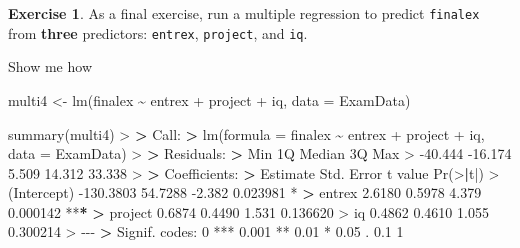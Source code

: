 \documentclass[
]{book}
\newenvironment{Shaded}{\begin{snugshade}}{\end{snugshade}}
\newcommand{\AttributeTok}[1]{\textcolor[rgb]{0.77,0.63,0.00}{#1}}
\newcommand{\DecValTok}[1]{\textcolor[rgb]{0.00,0.00,0.81}{#1}}
\newcommand{\ErrorTok}[1]{\textcolor[rgb]{0.64,0.00,0.00}{\textbf{#1}}}
\newcommand{\FloatTok}[1]{\textcolor[rgb]{0.00,0.00,0.81}{#1}}
\newcommand{\FunctionTok}[1]{\textcolor[rgb]{0.00,0.00,0.00}{#1}}
\newcommand{\NormalTok}[1]{#1}
\newcommand{\OtherTok}[1]{\textcolor[rgb]{0.56,0.35,0.01}{#1}}
\newcommand{\SpecialCharTok}[1]{\textcolor[rgb]{0.00,0.00,0.00}{#1}}
\newcommand{\StringTok}[1]{\textcolor[rgb]{0.31,0.60,0.02}{#1}}
\theoremstyle{definition}
\theoremstyle{definition}
\theoremstyle{definition}
\newtheorem{exercise}{Exercise}[chapter]
\theoremstyle{definition}
\theoremstyle{remark}
\begin{document}
\begin{exercise}

As a final exercise, run a multiple regression to predict \texttt{finalex} from \textbf{three} predictors: \texttt{entrex}, \texttt{project}, and \texttt{iq}.

Show me how

\begin{Shaded}
\begin{Highlighting}[]
\NormalTok{multi4 }\OtherTok{\textless{}{-}} \FunctionTok{lm}\NormalTok{(finalex }\SpecialCharTok{\textasciitilde{}}\NormalTok{ entrex }\SpecialCharTok{+}\NormalTok{ project }\SpecialCharTok{+}\NormalTok{ iq, }\AttributeTok{data =}\NormalTok{ ExamData)}

\FunctionTok{summary}\NormalTok{(multi4)}
\SpecialCharTok{\textgreater{}} 
\ErrorTok{\textgreater{}}\NormalTok{ Call}\SpecialCharTok{:}
\ErrorTok{\textgreater{}} \FunctionTok{lm}\NormalTok{(}\AttributeTok{formula =}\NormalTok{ finalex }\SpecialCharTok{\textasciitilde{}}\NormalTok{ entrex }\SpecialCharTok{+}\NormalTok{ project }\SpecialCharTok{+}\NormalTok{ iq, }\AttributeTok{data =}\NormalTok{ ExamData)}
\SpecialCharTok{\textgreater{}} 
\ErrorTok{\textgreater{}}\NormalTok{ Residuals}\SpecialCharTok{:}
\ErrorTok{\textgreater{}}\NormalTok{     Min      1Q  Median      3Q     Max }
\SpecialCharTok{\textgreater{}} \SpecialCharTok{{-}}\FloatTok{40.444} \SpecialCharTok{{-}}\FloatTok{16.174}   \FloatTok{5.509}  \FloatTok{14.312}  \FloatTok{33.338} 
\SpecialCharTok{\textgreater{}} 
\ErrorTok{\textgreater{}}\NormalTok{ Coefficients}\SpecialCharTok{:}
\ErrorTok{\textgreater{}}\NormalTok{              Estimate Std. Error t value }\FunctionTok{Pr}\NormalTok{(}\SpecialCharTok{\textgreater{}}\ErrorTok{|}\NormalTok{t}\SpecialCharTok{|}\NormalTok{)    }
\SpecialCharTok{\textgreater{}}\NormalTok{ (Intercept) }\SpecialCharTok{{-}}\FloatTok{130.3803}    \FloatTok{54.7288}  \SpecialCharTok{{-}}\FloatTok{2.382} \FloatTok{0.023981} \SpecialCharTok{*}  
\ErrorTok{\textgreater{}}\NormalTok{ entrex         }\FloatTok{2.6180}     \FloatTok{0.5978}   \FloatTok{4.379} \FloatTok{0.000142} \SpecialCharTok{**}\ErrorTok{*}
\ErrorTok{\textgreater{}}\NormalTok{ project        }\FloatTok{0.6874}     \FloatTok{0.4490}   \FloatTok{1.531} \FloatTok{0.136620}    
\SpecialCharTok{\textgreater{}}\NormalTok{ iq             }\FloatTok{0.4862}     \FloatTok{0.4610}   \FloatTok{1.055} \FloatTok{0.300214}    
\SpecialCharTok{\textgreater{}} \SpecialCharTok{{-}{-}{-}}
\ErrorTok{\textgreater{}}\NormalTok{ Signif. codes}\SpecialCharTok{:}  \DecValTok{0} \StringTok{\textquotesingle{}***\textquotesingle{}} \FloatTok{0.001} \StringTok{\textquotesingle{}**\textquotesingle{}} \FloatTok{0.01} \StringTok{\textquotesingle{}*\textquotesingle{}} \FloatTok{0.05} \StringTok{\textquotesingle{}.\textquotesingle{}} \FloatTok{0.1} \StringTok{\textquotesingle{} \textquotesingle{}} \DecValTok{1}

\end{Highlighting}
\end{Shaded}
\end{exercise}
\end{document}
